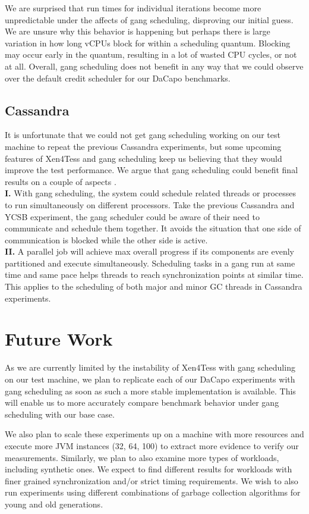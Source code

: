 \documentclass{sig-alternate}
\begin{document}
We are surprised that run times for individual iterations become more unpredictable under the affects of gang scheduling, disproving our initial guess. We are unsure why this behavior is happening but perhaps there is large variation in how long vCPUs block for within a scheduling quantum. Blocking may occur early in the quantum, resulting in a lot of wasted CPU cycles, or not at all. Overall, gang scheduling does not benefit in any way that we could observe over the default credit scheduler for our DaCapo benchmarks.

\subsection{Cassandra} \label{subsec:cassandragang}
It is unfortunate that we could not get gang scheduling working on our test machine to repeat the previous Cassandra experiments, but some upcoming features of Xen4Tess and gang scheduling keep us believing that they would improve the test performance. We argue that gang scheduling could benefit final results on a couple of aspects \cite{feitelson1992gang}.
\\\textbf{I.} With gang scheduling, the system could schedule related threads or processes to run simultaneously on different processors. Take the previous Cassandra and YCSB experiment, the gang scheduler could be aware of their need to communicate and schedule them together. It avoids the situation that one side of communication is blocked while the other side is active.
\\\textbf{II.} A parallel job will achieve max overall progress if its components are evenly partitioned and execute simultaneously. Scheduling tasks in a gang run at same time and same pace helps threads to reach synchronization points at similar time. This applies to the scheduling of both major and minor GC threads in Cassandra experiments.

\section{Future Work} \label{sec:futurework}
As we are currently limited by the instability of Xen4Tess with gang scheduling on our test machine, we plan to replicate each of our DaCapo experiments with gang scheduling as soon as such a more stable implementation is available. This will enable us to more accurately compare benchmark behavior under gang scheduling with our base case.

We also plan to scale these experiments up on a machine with more resources and execute more JVM instances (32, 64, 100) to extract more evidence to verify our measurements. Similarly, we plan to also examine more types of workloads, including synthetic ones. We expect to find different results for workloads with finer grained synchronization and/or strict timing requirements. We wish to also run experiments using different combinations of garbage collection algorithms for young and old generations.
\end{document}

